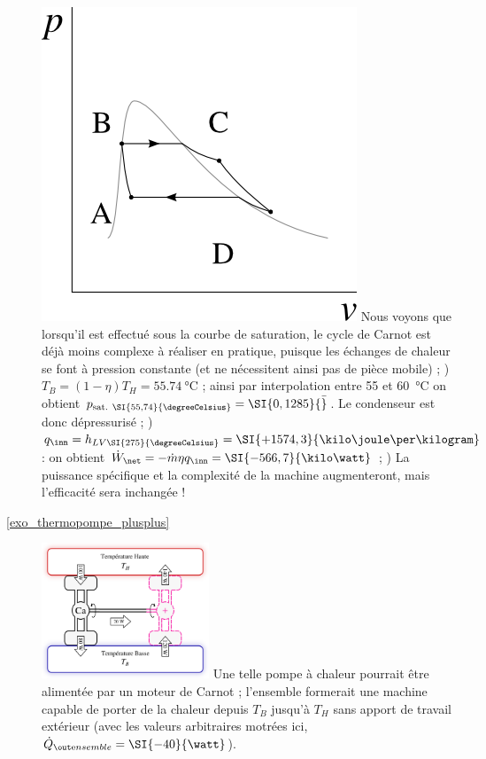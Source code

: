 \begin{description}
					\includegraphics[width=\solutiondiagramwidth]{images/exo_sol_pv_carnot_lv_2.png}
					Nous voyons que lorsqu’il est effectué sous la courbe de saturation, le cycle de Carnot est déjà moins complexe à réaliser en pratique, puisque les échanges de chaleur se font à pression constante (et ne nécessitent ainsi pas de pièce mobile)  ;
					) $T_B = (1 - \eta) T_H = \SI{55,74}{\degreeCelsius}$ ; ainsi par interpolation entre \num{55} et \SI{60}{\degreeCelsius} on obtient $p_\text{sat. \SI{55,74}{\degreeCelsius}} = \SI{0,1285}{\bar}$. Le condenseur est donc dépressurisé  ;
					) $q_\inn = h_{LV\SI{275}{\degreeCelsius}} = \SI{+1574,3}{\kilo\joule\per\kilogram}$ : on obtient $\dot W_\net = -\dot m \eta q_\inn = \SI{-566,7}{\kilo\watt}$  ;
					) La puissance spécifique et la complexité de la machine augmenteront, mais l’efficacité sera inchangée !
		\item [\ref{exo_thermopompe_plusplus}]
					\includegraphics[width=5cm]{images/carnot_thermopompe_plusplus.png}
					\tab\tab Une telle pompe à chaleur pourrait être alimentée par un moteur de Carnot ; l’ensemble formerait une machine capable de porter de la chaleur depuis $T_B$ jusqu’à $T_H$ sans apport de travail extérieur (avec les valeurs arbitraires motrées ici, $\dot Q_{\out \text ensemble} = \SI{-40}{\watt}$).

\end{description}
